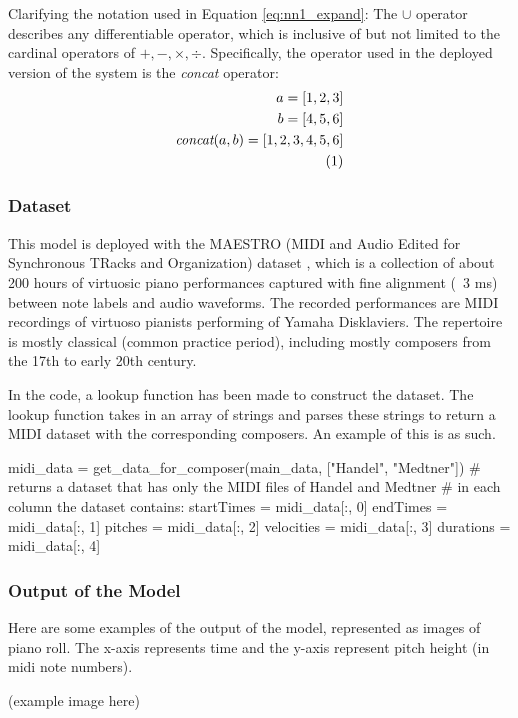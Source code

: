 \documentclass{article}
\newcommand\numberthis{\addtocounter{equation}{1}\tag{\theequation}}
\begin{document}
Clarifying the notation used in Equation \ref{eq:nn1_expand}: The $\cup$ operator describes any differentiable operator, which is inclusive of but not limited to the cardinal operators of $+,-,\times,\div$. Specifically, the operator used in the deployed version of the system is the \textit{concat} operator:
\begin{align*}
	a = [1,2,3]                          \\
	b = [4,5,6]                          \\
	\textit{concat}(a,b) = [1,2,3,4,5,6] \\
	\numberthis
\end{align*}
\subsubsection{Dataset}
This model is deployed with the MAESTRO (MIDI and Audio Edited for Synchronous TRacks and Organization) dataset \citep{hawthorne2018enabling}, which is a collection of about 200 hours of virtuosic piano performances captured with fine alignment (~3 ms) between note labels and audio waveforms. The recorded performances are MIDI recordings of virtuoso pianists performing of Yamaha Disklaviers. The repertoire is mostly classical (common practice period), including mostly composers from the 17th to early 20th century.

In the code, a lookup function has been made to construct the dataset. The lookup function takes in an array of strings and parses these strings to return a MIDI dataset with the corresponding composers. An example of this is as such.

\begin{ffcode}
	midi_data = get_data_for_composer(main_data, ["Handel", "Medtner"])
	# returns a dataset that has only the MIDI files of Handel and Medtner
	# in each column the dataset contains:
	startTimes = midi_data[:, 0]
	endTimes = midi_data[:, 1]
	pitches = midi_data[:, 2]
	velocities = midi_data[:, 3]
	durations = midi_data[:, 4]
\end{ffcode}

\subsubsection{Output of the Model}
Here are some examples of the output of the model, represented as images of piano roll. The x-axis represents time and the y-axis represent pitch height (in midi note numbers).

(example image here)
\end{document}
